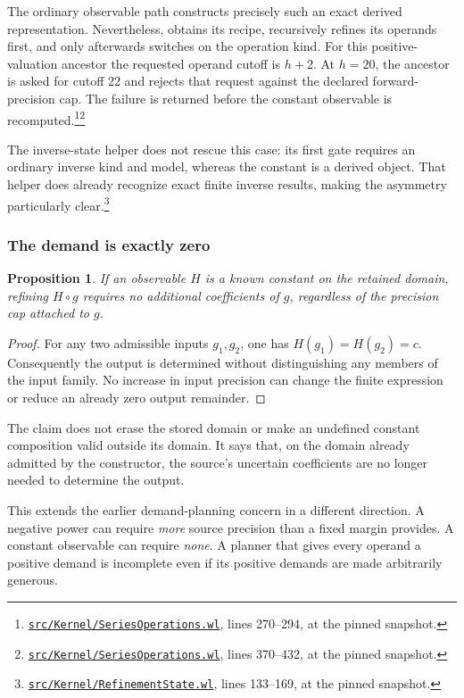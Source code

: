 \documentclass[11pt,letterpaper]{article}
\newcommand{\code}[1]{\texttt{\detokenize{#1}}}
\newcommand{\sr}[3]{\footnote{\href{https://github.com/VladimirReshetnikov/Asymptotic/blob/6687962f3c858a4f93623cfc496f33e35c6763d4/#1\#L#2-L#3}{\nolinkurl{#1}}, lines #2--#3, at the pinned snapshot.}}
\newtheorem{proposition}{Proposition}
\begin{document}
The ordinary observable path constructs precisely such an exact derived representation. Nevertheless, \code{SeriesRefine} obtains its recipe, recursively refines its operands first, and only afterwards switches on the operation kind. For this positive-valuation ancestor the requested operand cutoff is $h+2$. At $h=20$, the ancestor is asked for cutoff 22 and rejects that request against the declared forward-precision cap. The failure is returned before the constant observable is recomputed.\sr{src/Kernel/SeriesOperations.wl}{270}{294}\sr{src/Kernel/SeriesOperations.wl}{370}{432}

The inverse-state helper does not rescue this case: its first gate requires an ordinary inverse kind and model, whereas the constant is a derived object. That helper does already recognize exact finite inverse results, making the asymmetry particularly clear.\sr{src/Kernel/RefinementState.wl}{133}{169}

\subsubsection*{The demand is exactly zero}

\begin{proposition}
If an observable $H$ is a known constant on the retained domain, refining $H\circ g$ requires no additional coefficients of $g$, regardless of the precision cap attached to $g$.
\end{proposition}
\begin{proof}
For any two admissible inputs $g_1,g_2$, one has $H(g_1)=H(g_2)=c$. Consequently the output is determined without distinguishing any members of the input family. No increase in input precision can change the finite expression or reduce an already zero output remainder.
\end{proof}

The claim does not erase the stored domain or make an undefined constant composition valid outside its domain. It says that, on the domain already admitted by the constructor, the source's uncertain coefficients are no longer needed to determine the output.

This extends the earlier demand-planning concern in a different direction. A negative power can require \emph{more} source precision than a fixed margin provides. A constant observable can require \emph{none}. A planner that gives every operand a positive demand is incomplete even if its positive demands are made arbitrarily generous.
\end{document}
